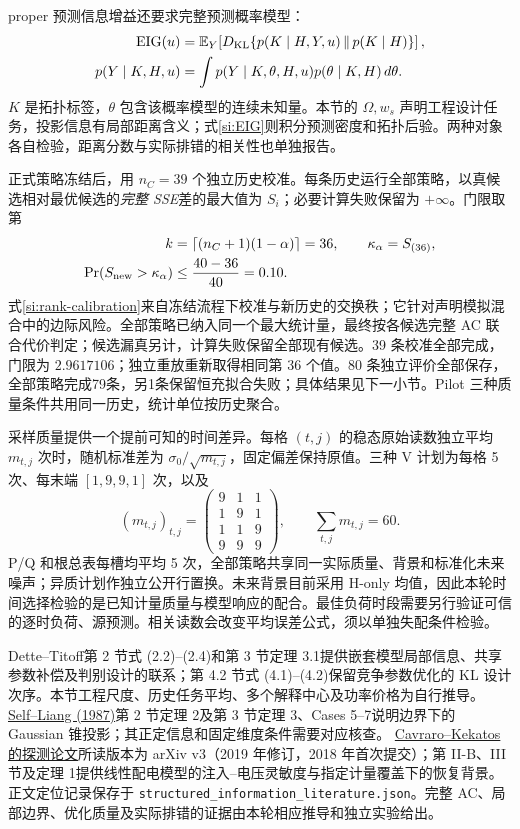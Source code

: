 proper 预测信息增益还要求完整预测概率模型：
\begin{align}
 \operatorname{EIG}(u)&=\mathbb E_Y\!\left[
 D_{\rm KL}\{p(K\mid H,Y,u)\,\|\,p(K\mid H)\}\right],\nonumber\\
 p(Y\mid K,H,u)&=\int p(Y\mid K,\theta,H,u)p(\theta\mid K,H)\,d\theta.
 \label{si:EIG}
\end{align}
$K$ 是拓扑标签，$\theta$ 包含该概率模型的连续未知量。本节的 $\Omega,w_s$ 声明工程设计任务，投影信息有局部距离含义；式\eqref{si:EIG}则积分预测密度和拓扑后验。两种对象各自检验，距离分数与实际排错的相关性也单独报告。

正式策略冻结后，用 $n_C=39$ 个独立历史校准。每条历史运行全部策略，以真候选相对最优候选的\emph{完整 SSE}差的最大值为 $S_i$；必要计算失败保留为 $+\infty$。门限取第
\begin{align}
 k&=\lceil(n_C+1)(1-\alpha)\rceil=36,\qquad
 \kappa_\alpha=S_{(36)},\nonumber\\
 \Pr(S_{\rm new}>\kappa_\alpha)&\le\frac{40-36}{40}=0.10.
 \label{si:rank-calibration}
\end{align}
式\eqref{si:rank-calibration}来自冻结流程下校准与新历史的交换秩；它针对声明模拟混合中的边际风险。全部策略已纳入同一个最大统计量，最终按各候选完整 AC 联合代价判定；候选漏真另计，计算失败保留全部现有候选。39 条校准全部完成，门限为 $2.9617106$；独立重放重新取得相同第 36 个值。80 条独立评价全部保存，全部策略完成79条，另1条保留恒充拟合失败；具体结果见下一小节。Pilot 三种质量条件共用同一历史，统计单位按历史聚合。

采样质量提供一个提前可知的时间差异。每格 $(t,j)$ 的稳态原始读数独立平均 $m_{t,j}$ 次时，随机标准差为 $\sigma_0/\sqrt{m_{t,j}}$，固定偏差保持原值。三种 V 计划为每格 5 次、每末端 $[1,9,9,1]$ 次，以及
\begin{equation}
 (m_{t,j})_{t,j}=\begin{pmatrix}9&1&1\\1&9&1\\1&1&9\\9&9&9\end{pmatrix},
 \qquad\sum_{t,j}m_{t,j}=60.
 \label{si:public-quality}
\end{equation}
P/Q 和根总表每槽均平均 5 次，全部策略共享同一实际质量、背景和标准化未来噪声；异质计划作独立公开行置换。未来背景目前采用 H-only 均值，因此本轮时间选择检验的是已知计量质量与模型响应的配合。最佳负荷时段需要另行验证可信的逐时负荷、源预测。相关读数会改变平均误差公式，须以单独失配条件检验。

Dette--Titoff\cite{dette}第 2 节式 (2.2)--(2.4)和第 3 节定理 3.1提供嵌套模型局部信息、共享参数补偿及判别设计的联系；第 4.2 节式 (4.1)--(4.2)保留竞争参数优化的 KL 设计次序。本节工程尺度、历史任务平均、多个解释中心及功率价格为自行推导。
\href{https://www.stat.cmu.edu/~brian/763-2015/week06/papers/self-liang-1987.pdf}{Self--Liang (1987)}第 2 节定理 2及第 3 节定理 3、Cases 5--7说明边界下的 Gaussian 锥投影；其正定信息和固定维度条件需要对应核查。
\href{https://arxiv.org/pdf/1802.06027}{Cavraro--Kekatos 的探测论文}所读版本为 arXiv v3（2019 年修订，2018 年首次提交）；第 II-B、III 节及定理 1提供线性配电模型的注入--电压灵敏度与指定计量覆盖下的恢复背景。正文定位记录保存于 \texttt{structured\_information\_literature.json}。完整 AC、局部边界、优化质量及实际排错的证据由本轮相应推导和独立实验给出。

